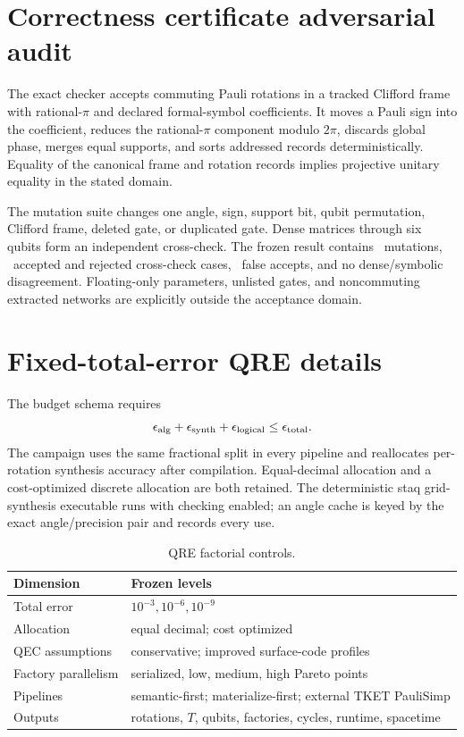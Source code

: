 \documentclass[a4paper,onecolumn,10pt,unpublished]{quantumarticle}
\begin{document}
\section{Correctness certificate adversarial audit}
\label{supp:w6}

The exact checker accepts commuting Pauli rotations in a tracked Clifford
frame with rational-$\pi$ and declared formal-symbol coefficients.  It moves a
Pauli sign into the coefficient, reduces the rational-$\pi$ component modulo
$2\pi$, discards global phase, merges equal supports, and sorts addressed
records deterministically.  Equality of the canonical frame and rotation
records implies projective unitary equality in the stated domain.

The mutation suite changes one angle, sign, support bit, qubit permutation,
Clifford frame, deleted gate, or duplicated gate.  Dense matrices through six
qubits form an independent cross-check.  The frozen result contains
\CertificateMutationCases\ mutations, \CertificateCrosscheckCases\ accepted
and rejected cross-check cases, \CertificateFalseAccepts\ false accepts, and
no dense/symbolic disagreement.  Floating-only parameters, unlisted gates, and
noncommuting extracted networks are explicitly outside the acceptance domain.

\section{Fixed-total-error QRE details}
\label{supp:w7}

The budget schema requires
\begin{equation}
 \epsilon_{\rm alg}+\epsilon_{\rm synth}+\epsilon_{\rm logical}
 \leq\epsilon_{\rm total}.
\end{equation}
The campaign uses the same fractional split in every pipeline and reallocates
per-rotation synthesis accuracy after compilation.  Equal-decimal allocation
and a cost-optimized discrete allocation are both retained.  The deterministic
staq grid-synthesis executable runs with checking enabled; an angle cache is
keyed by the exact angle/precision pair and records every use.

\begin{table}[h]
\caption{QRE factorial controls.}
\label{supp:tab:qre-grid}
\centering
\begin{tabular}{ll}
\toprule
Dimension & Frozen levels\\
\midrule
Total error & $10^{-3},10^{-6},10^{-9}$\\
Allocation & equal decimal; cost optimized\\
QEC assumptions & conservative; improved surface-code profiles\\
Factory parallelism & serialized, low, medium, high Pareto points\\
Pipelines & semantic-first; materialize-first; external TKET PauliSimp\\
Outputs & rotations, $T$, qubits, factories, cycles, runtime, spacetime\\
\bottomrule
\end{tabular}
\end{table}
\end{document}
